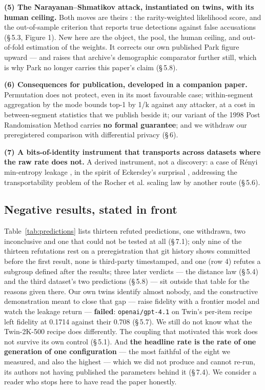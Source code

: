 \documentclass[sigconf,anonymous,review]{acmart}
\begin{document}
\textbf{(5) The Narayanan--Shmatikov attack, instantiated on twins, with its human ceiling.} Both moves are theirs \cite{narayanan2008robust}: the rarity-weighted likelihood score, and the out-of-sample criterion that reports true detections against false accusations (\S\,5.3, Figure 1). New here are the object, the pool, the human ceiling, and out-of-fold estimation of the weights. It corrects our own published Park figure upward --- and raises that archive's demographic comparator further still, which is why Park no longer carries this paper's claim (\S\,5.8).

\textbf{(6) Consequences for publication, developed in a companion paper.} Permutation does not protect, even in its most favourable case; within-segment aggregation by the mode bounds top-1 by 1/k against any attacker, at a cost in between-segment statistics that we publish beside it; our variant of the 1998 Post Randomisation Method carries \textbf{no formal guarantee}; and we withdraw our preregistered comparison with differential privacy (\S\,6).

\textbf{(7) A bits-of-identity instrument that transports across datasets where the raw rate does not.} A derived instrument, not a discovery: a case of Rényi min-entropy leakage \cite{smith2009foundations}, in the spirit of Eckersley's surprisal \cite{eckersley2010unique}, addressing the transportability problem of the Rocher et al. scaling law \cite{rocher2025scaling} by another route (\S\,5.6).

\subsection{Negative results, stated in front}

Table~\ref{tab:predictions} lists thirteen refuted predictions, one withdrawn, two inconclusive and one that could not be tested at all (\S\,7.1); only nine of the thirteen refutations rest on a preregistration that git history shows committed before the first result, none is third-party timestamped, and one (row 4) refutes a subgroup defined after the results; three later verdicts --- the distance law (\S\,5.4) and the third dataset's two predictions (\S\,5.8) --- sit outside that table for the reasons given there. Our own twins identify almost nobody, and the constructive demonstration meant to close that gap --- raise fidelity with a frontier model and watch the leakage return --- \textbf{failed}: \texttt{openai/\allowbreak{}gpt-\allowbreak{}4\allowbreak{}.1} on Twin's per-item recipe left fidelity at 0.1714 against their 0.708 (\S\,5.7). We still do not know what the Twin-2K-500 recipe does differently. The coupling that motivated this work does not survive its own control (\S\,5.1). And \textbf{the headline rate is the rate of one generation of one configuration} --- the most faithful of the eight we measured, and also the highest --- which we did not produce and cannot re-run, its authors not having published the parameters behind it (\S\,7.4). We consider a reader who stops here to have read the paper honestly.
\end{document}
